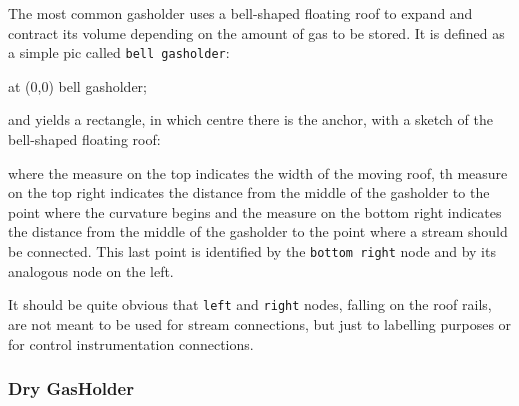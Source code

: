 \documentclass[12pt]{article}						%
\newcommand*{\chpn}[1]{\texttt{#1}}				%
\newcommand*{\chpp}[1]{\texttt{#1}}				%
\begin{document}
The most common gasholder uses a bell-shaped floating roof to expand and contract
its volume depending on the amount of gas to be stored. It is defined as a simple
pic called \chpp{bell gasholder}:
\begin{chpcode}
	\pic at (0,0) {bell gasholder};
\end{chpcode}
and yields a rectangle, in which centre there is the anchor, with a sketch of
the bell-shaped floating roof:
\begin{center}
\end{center}
where the measure on the top indicates the width of the moving roof, th measure
on the top right indicates the distance from the middle of the gasholder to the
point where the curvature begins and the measure on the bottom right indicates
the distance from the middle of the gasholder to the point where a stream should
be connected. This last point is identified by the \chpn{bottom right} node and
by its analogous node on the left.

It should be quite obvious that \chpn{left} and \chpn{right} nodes, falling on
the roof rails, are not meant to be used for stream connections, but just to
labelling purposes or for control instrumentation connections.

\subsubsection{Dry GasHolder}
\end{document}
